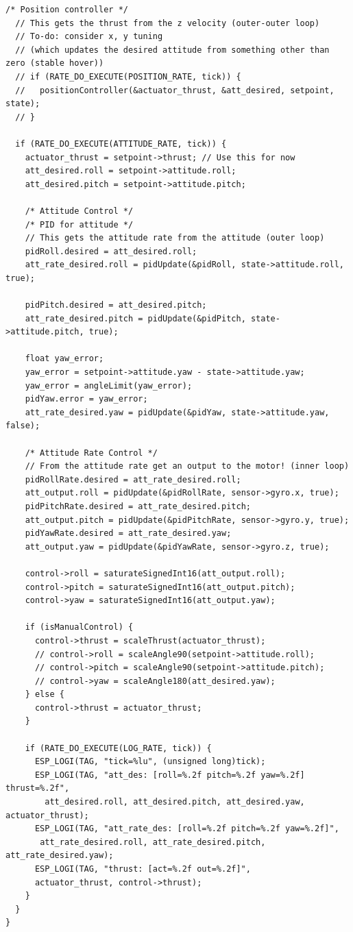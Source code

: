 \begin{lstlisting}[caption={controller.c}]
  /* Position controller */
  // This gets the thrust from the z velocity (outer-outer loop)
  // To-do: consider x, y tuning
  // (which updates the desired attitude from something other than zero (stable hover))
  // if (RATE_DO_EXECUTE(POSITION_RATE, tick)) {
  //   positionController(&actuator_thrust, &att_desired, setpoint, state);
  // }

  if (RATE_DO_EXECUTE(ATTITUDE_RATE, tick)) {
    actuator_thrust = setpoint->thrust; // Use this for now 
    att_desired.roll = setpoint->attitude.roll;
    att_desired.pitch = setpoint->attitude.pitch; 

    /* Attitude Control */
    /* PID for attitude */
    // This gets the attitude rate from the attitude (outer loop)
    pidRoll.desired = att_desired.roll;
    att_rate_desired.roll = pidUpdate(&pidRoll, state->attitude.roll, true); 

    pidPitch.desired = att_desired.pitch;
    att_rate_desired.pitch = pidUpdate(&pidPitch, state->attitude.pitch, true); 

    float yaw_error;
    yaw_error = setpoint->attitude.yaw - state->attitude.yaw;
    yaw_error = angleLimit(yaw_error);
    pidYaw.error = yaw_error;
    att_rate_desired.yaw = pidUpdate(&pidYaw, state->attitude.yaw, false);
    
    /* Attitude Rate Control */
    // From the attitude rate get an output to the motor! (inner loop)
    pidRollRate.desired = att_rate_desired.roll;
    att_output.roll = pidUpdate(&pidRollRate, sensor->gyro.x, true);
    pidPitchRate.desired = att_rate_desired.pitch;
    att_output.pitch = pidUpdate(&pidPitchRate, sensor->gyro.y, true);
    pidYawRate.desired = att_rate_desired.yaw;
    att_output.yaw = pidUpdate(&pidYawRate, sensor->gyro.z, true);

    control->roll = saturateSignedInt16(att_output.roll);
    control->pitch = saturateSignedInt16(att_output.pitch);
    control->yaw = saturateSignedInt16(att_output.yaw);

    if (isManualControl) {
      control->thrust = scaleThrust(actuator_thrust);
      // control->roll = scaleAngle90(setpoint->attitude.roll);
      // control->pitch = scaleAngle90(setpoint->attitude.pitch); 
      // control->yaw = scaleAngle180(att_desired.yaw); 
    } else {
      control->thrust = actuator_thrust;
    } 

    if (RATE_DO_EXECUTE(LOG_RATE, tick)) {
      ESP_LOGI(TAG, "tick=%lu", (unsigned long)tick);
      ESP_LOGI(TAG, "att_des: [roll=%.2f pitch=%.2f yaw=%.2f] thrust=%.2f",
        att_desired.roll, att_desired.pitch, att_desired.yaw, actuator_thrust);
      ESP_LOGI(TAG, "att_rate_des: [roll=%.2f pitch=%.2f yaw=%.2f]",
       att_rate_desired.roll, att_rate_desired.pitch, att_rate_desired.yaw);
      ESP_LOGI(TAG, "thrust: [act=%.2f out=%.2f]",
      actuator_thrust, control->thrust);
    }
  }
}


\end{lstlisting}
